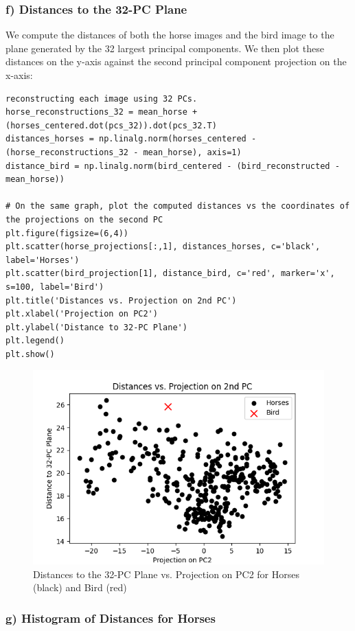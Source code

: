 \documentclass{article}
\begin{document}
\subsubsection*{f) Distances to the 32-PC Plane}

We compute the distances of both the horse images and the bird image to the plane generated by the 32 largest principal components. We then plot these distances on the y-axis against the second principal component projection on the x-axis:

\begin{verbatim}
reconstructing each image using 32 PCs.
horse_reconstructions_32 = mean_horse + (horses_centered.dot(pcs_32)).dot(pcs_32.T)
distances_horses = np.linalg.norm(horses_centered - (horse_reconstructions_32 - mean_horse), axis=1)
distance_bird = np.linalg.norm(bird_centered - (bird_reconstructed - mean_horse))

# On the same graph, plot the computed distances vs the coordinates of the projections on the second PC
plt.figure(figsize=(6,4))
plt.scatter(horse_projections[:,1], distances_horses, c='black', label='Horses')
plt.scatter(bird_projection[1], distance_bird, c='red', marker='x', s=100, label='Bird')
plt.title('Distances vs. Projection on 2nd PC')
plt.xlabel('Projection on PC2')
plt.ylabel('Distance to 32-PC Plane')
plt.legend()
plt.show()
\end{verbatim}

\begin{figure}[ht]
    \centering
    \includegraphics[width=.6\textwidth]{distances_vs_pc2.png}
    \caption{Distances to the 32-PC Plane vs. Projection on PC2 for Horses (black) and Bird (red)}
    \label{fig:distances_vs_pc2}
\end{figure}
\newpage
\subsubsection*{g) Histogram of Distances for Horses}
\end{document}
